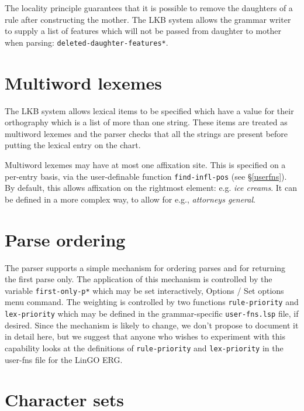 \documentclass[12pt]{report}
\newcommand{\filename}[1]{{\tt #1}}
\newcommand{\functionname}[1]{{\tt #1}}
\newcommand{\lkbparam}[1]{{\tt #1}}
\newcommand{\lkbmenucommand}{{\bf}}
\begin{document}
The locality principle guarantees that it is possible to remove the daughters
of a rule after constructing the mother.  The LKB system allows the grammar
writer to supply a list of features which will not be passed 
from daughter to mother when parsing: \lkbparam{*deleted-daughter-features*}.

\section{Multiword lexemes}
\label{multiword}

The LKB system allows lexical items to be specified which
have a value for their orthography which is a list of 
more than one string.
These items are treated as multiword lexemes and the 
parser checks that all the strings are present before
putting the lexical entry on the chart.

Multiword lexemes may have at most one affixation site.
This is specified on a per-entry basis, via the
user-definable function \functionname{find-infl-pos} (see \S\ref{userfns}).
By default, this allows affixation on the rightmost element:
e.g. {\it ice creams}.  It can be defined in a more complex
way, to allow for e.g., {\it attorneys general}.

\section{Parse ordering}
\label{first-only}

The parser supports a simple mechanism for ordering parses and for
returning the first parse only.  The application of this mechanism
is controlled by the variable \lkbparam{*first-only-p*}
which may be set interactively, 
{\lkbmenucommand Options} / {\lkbmenucommand Set options} menu command.
The
weighting is controlled by two functions \functionname{rule-priority} 
and \functionname{lex-priority}
which may be defined in 
the grammar-specific
\filename{user-fns.lsp} file, if desired.  
Since the mechanism is likely to change, we don't
propose to document it in detail here, but we suggest that anyone who
wishes to experiment with this capability looks at the definitions of
\functionname{rule-priority} 
and \functionname{lex-priority} in the user-fns file for the LinGO ERG.

\section{Character sets}
\label{accents}
\end{document}
